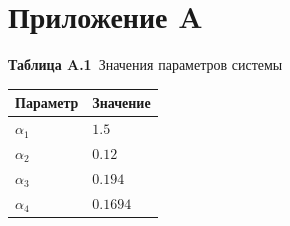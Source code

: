 \documentclass[14pt,a4paper]{extarticle}
\begin{document}
	\section*{Приложение A}
	\begin{center}
		\textbf{Таблица A.1}~Значения параметров системы
		
		\begin{tabu}{ |X[c]|X[c]| } 
			\hline
			Параметр & Значение\\
			\hline 
			$\alpha_1$ & $1.5$\\
			$\alpha_2$ & $0.12$\\
			$\alpha_3$ & $0.194$\\
			$\alpha_4$ & $0.1694$\\ 

\end{tabu}
\end{center}
\end{document}
